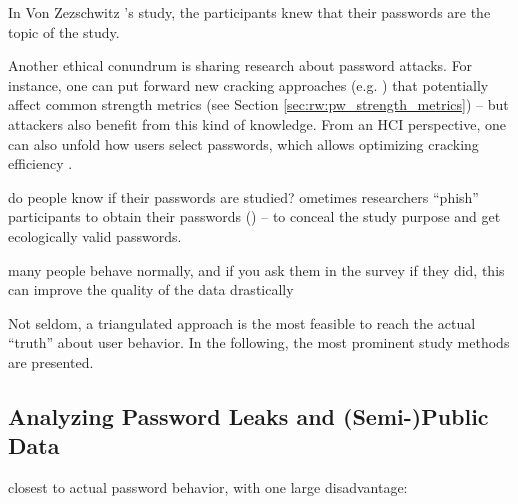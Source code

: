 In Von Zezschwitz \etal's study, the participants knew that their passwords are the topic of the study.


Another ethical conundrum is sharing research about password attacks. For instance, one can put forward new cracking approaches (e.g. \cite{Marechal2008AdvancesPWCracking, Narayanan2005FastDictionaryAttacks, Schmidt2013Pitfalls, Weir2009PCFG}) that potentially affect common strength metrics (see Section \ref{sec:rw:pw_strength_metrics}) -- but attackers also benefit from this kind of knowledge. From an HCI perspective, one can also unfold how users select passwords, which allows optimizing cracking efficiency \cite{Weir2010MetricsPolicies, Wheeler2016zxcvbn}. 

do people know if their passwords are studied?
ometimes researchers ``phish'' participants to obtain their passwords (\cite{Egelman2013DoesMyPasswordGoUpToEleven, Haque2014Hierarchy, Mazurek2013Measuring}) -- to conceal the study purpose and get ecologically valid passwords. 


 many people behave normally, and if you ask them in the survey if they did, this can improve the quality of the data drastically \cite{Fahl2013EcologicalValidityPasswordStudy}


Not seldom, a triangulated approach is the most feasible to reach the actual ``truth'' about user behavior. In the following, the most prominent study methods are presented. 


%
%
%

\subsection{Analyzing Password Leaks and (Semi-)Public Data}
closest to actual password behavior, with one large disadvantage: 
\cite{Bonneau2012LinguisticProperties}
\cite{Bonneau2012ScienceOfGuessing}
\cite{Veras2012VisualizingSemanticsPasswords}
\cite{Wash2016UnderstandingPasswordChoices}


